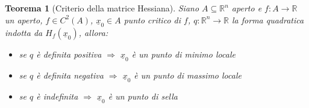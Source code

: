 \documentclass[12pt, a4paper]{article}
\theoremstyle{break}
\newtheorem{theorem}{Teorema} %
\begin{document}
\newpage
\begin{theorem} [Criterio della matrice Hessiana]
	Siano $A \subseteq \mathbb{R}^n$ aperto e $f: A \to \mathbb{R}$ un
	aperto, $f \in C^2(A)$, $\underline{x}_0 \in A$ punto critico di $f$, $q :
		\mathbb{R}^n \to \mathbb{R}$ la forma quadratica indotta da
	$H_f(\underline{x}_0)$, allora:
	\begin{itemize}
		\item se $q$ è definita positiva $\Rightarrow$ $\underline{x}_0$ è un
			punto di minimo locale
		\item se $q$ è definita negativa $\Rightarrow$ $\underline{x}_0$ è un
			punto di massimo locale
		\item se $q$ è indefinita $\Rightarrow$ $\underline{x}_0$ è un punto di
			sella
	\end{itemize}
\end{theorem}
\end{document}
